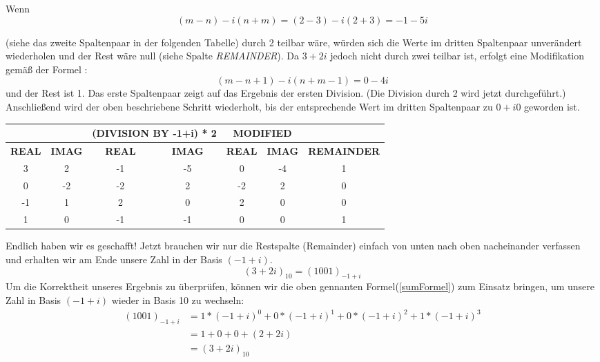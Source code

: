 \documentclass[course=erap]{aspdoc}
\begin{document}
Wenn
\[(m - n) - i(n+m)=(2-3) - i(2 + 3) = -1 - 5i\] 

(siehe das zweite Spaltenpaar in der folgenden Tabelle) durch 2 teilbar wäre, würden sich die Werte im dritten Spaltenpaar unverändert wiederholen und der Rest wäre null (siehe Spalte \textit{REMAINDER}). Da $3 + 2 i$ jedoch nicht durch zwei teilbar ist, erfolgt eine Modifikation gemäß der Formel :
\[(m - n + 1) - i(n + m - 1)= 0 - 4  i\] 
und der Rest ist 1. Das erste Spaltenpaar zeigt auf das Ergebnis der ersten Division. (Die Division durch 2 wird jetzt durchgeführt.) Anschließend wird der oben beschriebene Schritt wiederholt, bis der entsprechende Wert im dritten Spaltenpaar zu $0 + i0$ geworden ist.
\\

\begin{table}[!ht]
\centering
\begin{tabular}{|c|c|cc|cc|c|}
\hline
              &               & \multicolumn{2}{c|}{\textbf{(DIVISION BY -1+i) * 2}} & \multicolumn{2}{c|}{\textbf{MODIFIED}}             &                    \\ \hline
\textbf{REAL} & \textbf{IMAG} & \multicolumn{1}{c|}{\textbf{REAL}}  & \textbf{IMAG}  & \multicolumn{1}{c|}{\textbf{REAL}} & \textbf{IMAG} & \textbf{REMAINDER} \\ \hline
3             & 2             & \multicolumn{1}{c|}{-1}             & -5             & \multicolumn{1}{c|}{0}             & -4            & 1                  \\ \hline
0             & -2            & \multicolumn{1}{c|}{-2}             & 2              & \multicolumn{1}{c|}{-2}            & 2             & 0                  \\ \hline
-1            & 1             & \multicolumn{1}{c|}{2}              & 0              & \multicolumn{1}{c|}{2}             & 0             & 0                  \\ \hline
1             & 0             & \multicolumn{1}{c|}{-1}             & -1             & \multicolumn{1}{c|}{0}             & 0             & 1                  \\ \hline
\end{tabular}
\end{table}

Endlich haben wir es geschafft! Jetzt brauchen wir nur die Restspalte (Remainder) einfach von unten nach oben nacheinander verfassen und erhalten wir am Ende unsere Zahl in der Basis $(-1+i)$.
\[(3 + 2i)_{10} = (1001)_{-1+i}\]
\newline
Um die Korrektheit unseres Ergebnis zu überprüfen, können wir die oben gennanten Formel(\ref{sumFormel}) zum Einsatz bringen, um unsere Zahl in Basis $(-1+i)$ wieder in Basis 10 zu wechseln:
\begin{equation*}
    \begin{split}
        (1001)_{-1+i} &= 1*(-1+i)^0 + 0*(-1+i)^1 + 0*(-1+i)^2 +1*(-1+i)^3 \\
        &=1 + 0 + 0 + (2 + 2i) \\
        &= (3+2i)_{10}
    \end{split}   
\end{equation*}
\end{document}
